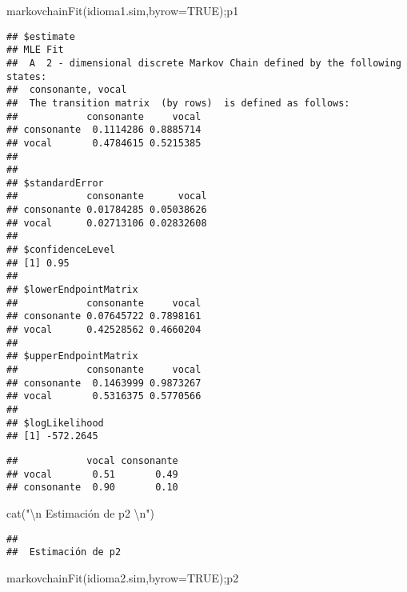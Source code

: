 \documentclass[
]{book}
\newenvironment{Shaded}{\begin{snugshade}}{\end{snugshade}}
\newcommand{\AttributeTok}[1]{\textcolor[rgb]{0.77,0.63,0.00}{#1}}
\newcommand{\ConstantTok}[1]{\textcolor[rgb]{0.00,0.00,0.00}{#1}}
\newcommand{\FunctionTok}[1]{\textcolor[rgb]{0.00,0.00,0.00}{#1}}
\newcommand{\NormalTok}[1]{#1}
\newcommand{\SpecialCharTok}[1]{\textcolor[rgb]{0.00,0.00,0.00}{#1}}
\newcommand{\StringTok}[1]{\textcolor[rgb]{0.31,0.60,0.02}{#1}}
\theoremstyle{definition}
\theoremstyle{definition}
\theoremstyle{definition}
\theoremstyle{definition}
\theoremstyle{remark}
\begin{document}
\begin{Shaded}
\begin{Highlighting}[]
\FunctionTok{markovchainFit}\NormalTok{(idioma1.sim,}\AttributeTok{byrow=}\ConstantTok{TRUE}\NormalTok{);p1}
\end{Highlighting}
\end{Shaded}

\begin{verbatim}
## $estimate
## MLE Fit 
##  A  2 - dimensional discrete Markov Chain defined by the following states: 
##  consonante, vocal 
##  The transition matrix  (by rows)  is defined as follows: 
##            consonante     vocal
## consonante  0.1114286 0.8885714
## vocal       0.4784615 0.5215385
## 
## 
## $standardError
##            consonante      vocal
## consonante 0.01784285 0.05038626
## vocal      0.02713106 0.02832608
## 
## $confidenceLevel
## [1] 0.95
## 
## $lowerEndpointMatrix
##            consonante     vocal
## consonante 0.07645722 0.7898161
## vocal      0.42528562 0.4660204
## 
## $upperEndpointMatrix
##            consonante     vocal
## consonante  0.1463999 0.9873267
## vocal       0.5316375 0.5770566
## 
## $logLikelihood
## [1] -572.2645
\end{verbatim}

\begin{verbatim}
##            vocal consonante
## vocal       0.51       0.49
## consonante  0.90       0.10
\end{verbatim}

\begin{Shaded}
\begin{Highlighting}[]
\FunctionTok{cat}\NormalTok{(}\StringTok{"}\SpecialCharTok{\textbackslash{}n}\StringTok{ Estimación de p2 }\SpecialCharTok{\textbackslash{}n}\StringTok{"}\NormalTok{)}
\end{Highlighting}
\end{Shaded}

\begin{verbatim}
## 
##  Estimación de p2
\end{verbatim}

\begin{Shaded}
\begin{Highlighting}[]
\FunctionTok{markovchainFit}\NormalTok{(idioma2.sim,}\AttributeTok{byrow=}\ConstantTok{TRUE}\NormalTok{);p2}
\end{Highlighting}
\end{Shaded}
\end{document}
